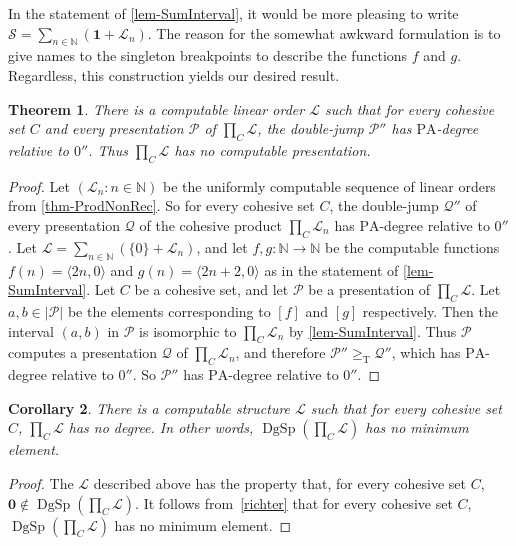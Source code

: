\documentclass[11pt,a4paper,reqno]{amsart}
\newtheorem{Theorem}{Theorem}[section]
\newtheorem{Corollary}[Theorem]{Corollary}
\theoremstyle{definition}
\DeclareMathOperator{\dgsp}{\mathrm{DgSp}}
\newcommand{\pa}{\mathrm{PA}}
\newcommand{\la}{\langle}
\newcommand{\ra}{\rangle}
\newcommand{\Nb}{\mathbb{N}}
\newcommand{\mc}[1]{\mathcal{#1}}
\newcommand{\geqT}{\geq_\mathrm{T}}
\begin{document}
In the statement of \cref{lem-SumInterval}, it would be more pleasing to write $\mc{S} = \sum_{n \in \Nb} (\bm{1} + \mc{L}_n)$.  The reason for the somewhat awkward formulation is to give names to the singleton breakpoints to describe the functions $f$ and $g$.
Regardless, this construction yields our desired result.

\begin{Theorem}\label{thm-LONonRec}
There is a computable linear order $\mc{L}$ such that for every cohesive set $C$ and every presentation $\mc{P}$ of $\prod_C \mc{L}$, the double-jump $\mc{P}''$ has $\pa$-degree relative to $0''$.  Thus $\prod_C \mc{L}$ has no computable presentation.
\end{Theorem}

\begin{proof}
Let $(\mc{L}_n : n \in \Nb)$ be the uniformly computable sequence of linear orders from \cref{thm-ProdNonRec}.  So for every cohesive set $C$, the double-jump $\mc{Q}''$ of every presentation $\mc{Q}$ of the cohesive product $\prod_C \mc{L}_n$ has $\pa$-degree relative to $0''$.  Let $\mc{L} = \sum_{n \in \Nb} (\{0\} + \mc{L}_n)$, and let $f, g \colon \Nb \to \Nb$ be the computable functions $f(n) = \la 2n, 0 \ra$ and $g(n) = \la 2n+2, 0 \ra$ as in the statement of \cref{lem-SumInterval}.  Let $C$ be a cohesive set, and let $\mc{P}$ be a presentation of $\prod_C \mc{L}$.  Let $a, b \in |\mc{P}|$ be the elements corresponding to $[f]$ and $[g]$ respectively.  Then the interval $(a,b)$ in $\mc{P}$ is isomorphic to $\prod_C \mc{L}_n$ by \cref{lem-SumInterval}.  Thus $\mc{P}$ computes a presentation $\mc{Q}$ of $\prod_C \mc{L}_n$, and therefore $\mc{P}'' \geqT \mc{Q}''$, which has $\pa$-degree relative to $0''$.  So $\mc{P}''$ has $\pa$-degree relative to $0''$.
\end{proof}

\begin{Corollary}
There is a computable structure $\mc{L}$ such that for every cohesive set $C$, $\prod_C \mc{L}$ has no degree. In other words, $\dgsp(\prod_C \mc{L})$ has no minimum element.
\end{Corollary}

\begin{proof}
The $\mc{L}$ described above has the property that, for every cohesive set $C$, $\mathbf{0} \notin \dgsp(\prod_C \mc{L})$.
It follows from~\cref{richter} that for every cohesive set $C$,  $\dgsp(\prod_C \mc{L})$ has no minimum element.
\end{proof}
\end{document}
